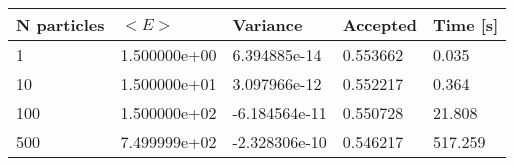 \begin{table}[h!]
\centering 
\begin{tabular}{|l|l|l|l|l|}
\hline 
N particles & $<E>$ & Variance & Accepted & Time [s]\\ 
 \hline 
1 & 1.500000e+00 & 6.394885e-14 & 0.553662 & 0.035 \\ \hline 
10 & 1.500000e+01 & 3.097966e-12 & 0.552217 & 0.364 \\ \hline 
100 & 1.500000e+02 & -6.184564e-11 & 0.550728 & 21.808 \\ \hline 
500 & 7.499999e+02 & -2.328306e-10 & 0.546217 & 517.259 \\ \hline 
\end{tabular}
\label{tab:hn3} 
\end{table} 
